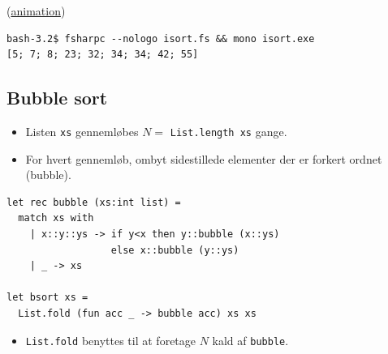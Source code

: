 \documentclass[rgb]{beamer}
\begin{document}
\begin{frame}[fragile]
\begin{footnotesize}
\begin{minipage}[b]{0.3\textwidth}
  (\href{https://upload.wikimedia.org/wikipedia/commons/a/ad/Insertion_Sort_Animation.gif}{animation})
\end{minipage}


\begin{verbatim}
bash-3.2$ fsharpc --nologo isort.fs && mono isort.exe
[5; 7; 8; 23; 32; 34; 34; 42; 55]
\end{verbatim}

\end{footnotesize}
\end{frame}

\subsection{Bubble sort}
\begin{frame}[fragile]
\begin{footnotesize}


  \begin{itemize}
  \item Listen \lstinline{xs} gennemløbes $N =$ \lstinline{List.length xs} gange.
  \item For hvert gennemløb, ombyt sidestillede elementer der er forkert ordnet (bubble).
  \end{itemize}


\begin{lstlisting}[numbers=none,frame=none,mathescape]
let rec bubble (xs:int list) =
  match xs with
    | x::y::ys -> if y<x then y::bubble (x::ys)
                  else x::bubble (y::ys)
    | _ -> xs

let bsort xs =
  List.fold (fun acc _ -> bubble acc) xs xs
\end{lstlisting}

\begin{itemize}
\item \lstinline{List.fold} benyttes til at foretage $N$ kald af \lstinline{bubble}.
\end{itemize}
\end{footnotesize}
\end{frame}
\end{document}
